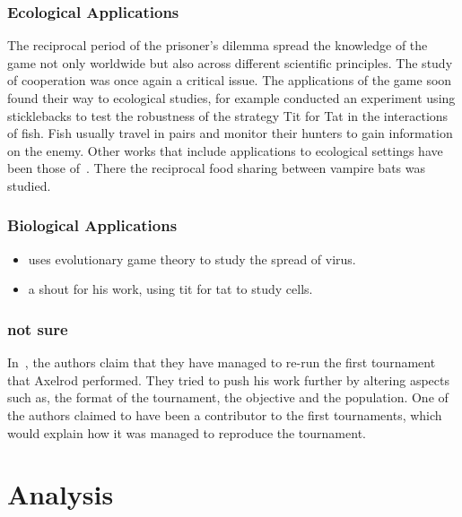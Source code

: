\documentclass{article}
\begin{document}
\subsubsection{Ecological Applications}

The reciprocal period of the prisoner's dilemma spread the knowledge of the
game not only worldwide but also across different scientific principles. The
study of cooperation was once again a critical issue. The applications of
the game soon found their way to ecological studies, for example 
\cite{Milinski1987} conducted an experiment using sticklebacks to test
the robustness of the strategy Tit for Tat in the interactions of fish. Fish usually
travel in pairs and monitor their hunters to gain information on the enemy.
Other works that include applications to ecological settings have been those
of~\cite{Godfray1992, Wilkinson1984}. There the reciprocal food sharing
between vampire bats was studied.

\subsubsection{Biological Applications}
\begin{itemize}
    \item \cite{Turner1999} uses evolutionary game theory to study the spread of
    virus.
    \item \cite{Douglas2011} a shout for his work, using tit for tat to study cells.
\end{itemize}
\subsubsection{not sure}
In~\cite{Rapoport2015}, the authors claim that they have managed to 
re-run the first tournament that Axelrod performed. They tried to push his work
further by altering aspects such as, the format of the tournament, the objective
and the population. One of the authors claimed to have been a contributor
to the first tournaments, which would explain how it was managed to reproduce
the tournament.

\section{Analysis}\label{section:analysis}



\end{document}
